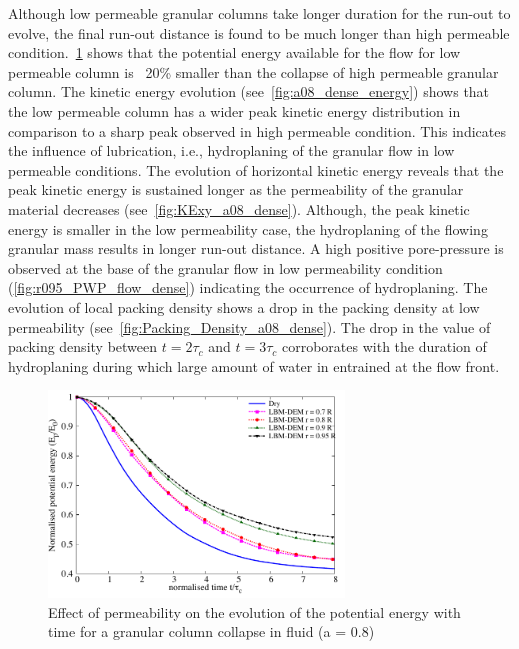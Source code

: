 Although low permeable granular columns take longer duration for the run-out to 
evolve, the final run-out distance is found to be much longer than high 
permeable condition.~\cref{fig:PE_a08_dense} shows that the potential energy 
available for the flow for low permeable column is ~20\% smaller than the 
collapse of high permeable granular column. The kinetic energy evolution 
(see~\cref{fig:a08_dense_energy}) shows that the low permeable column has a 
wider peak kinetic energy distribution in comparison to a sharp peak observed 
in high permeable condition. This indicates the influence of lubrication, i.e., 
hydroplaning of the granular flow in low permeable conditions. The evolution of 
horizontal kinetic energy reveals that the peak kinetic energy is sustained 
longer as the permeability of the granular material decreases 
(see~\cref{fig:KExy_a08_dense}). Although, the peak kinetic energy is smaller 
in the low permeability case, the hydroplaning of the flowing granular mass 
results in longer run-out distance. A high positive pore-pressure is observed 
at the base of the granular flow in low permeability condition 
(\cref{fig:r095_PWP_flow_dense}) indicating the occurrence of hydroplaning. The 
evolution of local packing density shows a drop in the packing density at low 
permeability (see~\cref{fig:Packing_Density_a08_dense}). The drop in the value 
of packing density between $t = 2\tau_c$ and $t=3\tau_c$ corroborates with the 
duration of hydroplaning during which large amount of water in entrained at the 
flow front.  

\begin{figure}
	\centering
    \includegraphics[width=0.7\textwidth]{PE_a08_dense}
    \caption{Effect of permeability on the evolution of the potential energy 
    with time for a granular column collapse in fluid (a = 0.8)}
    \label{fig:PE_a08_dense}
\end{figure}


